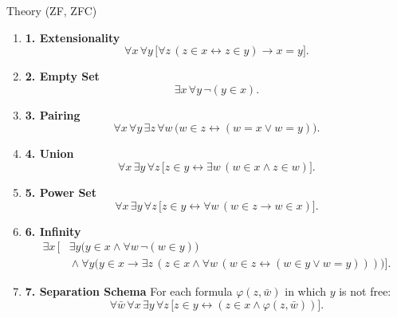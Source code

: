 \begin{modelbox}{Theory (ZF, ZFC)}


\modelpresentation{
\[
  \mathrm{ZF}:=\mathrm{Cn}_{\vdash}(\Sigma_{\mathrm{ZF}}),
  \qquad
  \mathrm{ZFC}:=\mathrm{Cn}_{\vdash}\bigl(\Sigma_{\mathrm{ZF}}\cup\{\mathrm{AC}\}\bigr).
\]
}

\begin{modelaxiomsblock}
\begin{enumerate}[leftmargin=1.6em,itemsep=2pt]
  \item \textbf{1. Extensionality}
  \[
  \forall x\,\forall y\,
  \bigl[\forall z\,(z\in x\leftrightarrow z\in y)\to x=y\bigr].
  \]

  \item \textbf{2. Empty Set}
  \[
  \exists x\,\forall y\,\neg(y\in x).
  \]

  \item \textbf{3. Pairing}
  \[
  \forall x\,\forall y\,\exists z\,\forall w\,
  \bigl(w\in z\leftrightarrow (w=x\vee w=y)\bigr).
  \]

  \item \textbf{4. Union}
  \[
  \forall x\,\exists y\,\forall z\,
  \bigl[z\in y\leftrightarrow \exists w\,(w\in x\wedge z\in w)\bigr].
  \]

  \item \textbf{5. Power Set}
  \[
  \forall x\,\exists y\,\forall z\,
  \bigl[z\in y\leftrightarrow \forall w\,(w\in z\to w\in x)\bigr].
  \]

  \item \textbf{6. Infinity}
  \[
  \begin{aligned}
  \exists x\,\Big[&
    \exists y\bigl(y\in x\wedge \forall w\,\neg(w\in y)\bigr)\\
    &{}\wedge
    \forall y\bigl(y\in x\to
      \exists z\,(z\in x\wedge
        \forall w\,(w\in z\leftrightarrow (w\in y\vee w=y)))\bigr)
  \Big].
  \end{aligned}
  \]

  \item \textbf{7. Separation Schema}
  For each formula \(\varphi(z,\bar w)\) in which \(y\) is not free:
  \[
  \forall \bar w\,\forall x\,\exists y\,\forall z\,
  \bigl[z\in y\leftrightarrow (z\in x\wedge \varphi(z,\bar w))\bigr].
  \]


\end{enumerate}
\end{modelaxiomsblock}
\end{modelbox}
